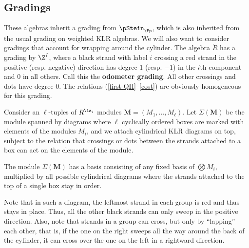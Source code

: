 \subsection{Gradings}

These algebras inherit a grading from $\pStein_\Fp$, which is also inherited from the usual grading on weighted KLR algebras.  We will also want to consider gradings that account for wrapping around the cylinder.   The algebra $\mathring{R}$ has a grading by $\Z^I$, where a black strand with label $i$ crossing a red strand in the positive (resp. negative) direction has degree $1$ (resp. $-1$) in the $i$th component and 0 in all others.  Call this the {\bf odometer grading}.  All other crossings and dots have degree 0.  The relations (\ref{first-QH}--\ref{cost}) are obviously homogeneous for this grading.  

Consider an $\ell$-tuples of $R^{\la_i}$ modules $\mathbf{M}=(M_1,\dots, M_\ell)$.  Let $\Sigma(\mathbf{M})$ be the module spanned by diagrams where $\ell$ cyclically ordered boxes are marked with elements of the modules $M_i$, and we attach cylindrical KLR diagrams on top, subject to the relation that crossings or dots between the strands attached to a box can act on the elements of the module.

\begin{lemma}
  The module $\Sigma(\mathbf{M})$ has a basis consisting of any fixed basis of $\bigotimes M_i$, multiplied by all possible cylindrical diagrams where the strands attached to the top of a single box stay in order.
\end{lemma}
Note that in such a diagram, the leftmost strand in each group is red and thus stays in place.  Thus, all the other black strands can only sweep in the positive direction.  Also, note that strands in a group can cross, but only by ``lapping'' each other, that is, if the one on the right sweeps all the way around the back of the cylinder, it can cross over the one on the left in a rightward direction.  

